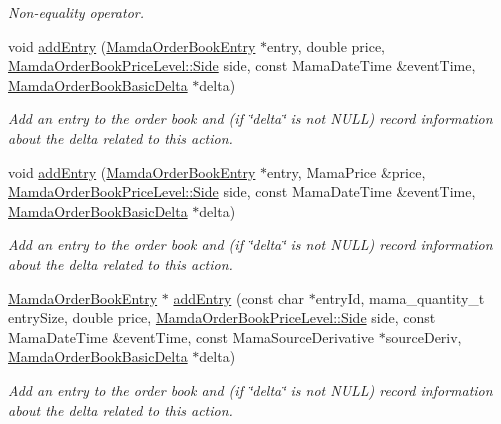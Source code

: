 \begin{CompactItemize}
\begin{CompactList}\small\item\em Non-equality operator. \item\end{CompactList}\item 
void \hyperlink{classWombat_1_1MamdaOrderBook_4b867bc23ef7687fb1ca4112534241f5}{add\-Entry} (\hyperlink{classWombat_1_1MamdaOrderBookEntry}{Mamda\-Order\-Book\-Entry} $\ast$entry, double price, \hyperlink{classWombat_1_1MamdaOrderBookPriceLevel_384c34b0a74d874b8969dee9b0d3718d}{Mamda\-Order\-Book\-Price\-Level::Side} side, const Mama\-Date\-Time \&event\-Time, \hyperlink{classWombat_1_1MamdaOrderBookBasicDelta}{Mamda\-Order\-Book\-Basic\-Delta} $\ast$delta)
\begin{CompactList}\small\item\em Add an entry to the order book and (if \char`\"{}delta\char`\"{} is not NULL) record information about the delta related to this action. \item\end{CompactList}\item 
void \hyperlink{classWombat_1_1MamdaOrderBook_6ea5d90b33f32a292c02123ddbb30831}{add\-Entry} (\hyperlink{classWombat_1_1MamdaOrderBookEntry}{Mamda\-Order\-Book\-Entry} $\ast$entry, Mama\-Price \&price, \hyperlink{classWombat_1_1MamdaOrderBookPriceLevel_384c34b0a74d874b8969dee9b0d3718d}{Mamda\-Order\-Book\-Price\-Level::Side} side, const Mama\-Date\-Time \&event\-Time, \hyperlink{classWombat_1_1MamdaOrderBookBasicDelta}{Mamda\-Order\-Book\-Basic\-Delta} $\ast$delta)
\begin{CompactList}\small\item\em Add an entry to the order book and (if \char`\"{}delta\char`\"{} is not NULL) record information about the delta related to this action. \item\end{CompactList}\item 
\hyperlink{classWombat_1_1MamdaOrderBookEntry}{Mamda\-Order\-Book\-Entry} $\ast$ \hyperlink{classWombat_1_1MamdaOrderBook_3bb82a1c36ba5d6c1db3fc14e10e2272}{add\-Entry} (const char $\ast$entry\-Id, mama\_\-quantity\_\-t entry\-Size, double price, \hyperlink{classWombat_1_1MamdaOrderBookPriceLevel_384c34b0a74d874b8969dee9b0d3718d}{Mamda\-Order\-Book\-Price\-Level::Side} side, const Mama\-Date\-Time \&event\-Time, const Mama\-Source\-Derivative $\ast$source\-Deriv, \hyperlink{classWombat_1_1MamdaOrderBookBasicDelta}{Mamda\-Order\-Book\-Basic\-Delta} $\ast$delta)
\begin{CompactList}\small\item\em Add an entry to the order book and (if \char`\"{}delta\char`\"{} is not NULL) record information about the delta related to this action. \item\end{CompactList}\item 

\end{CompactItemize}
